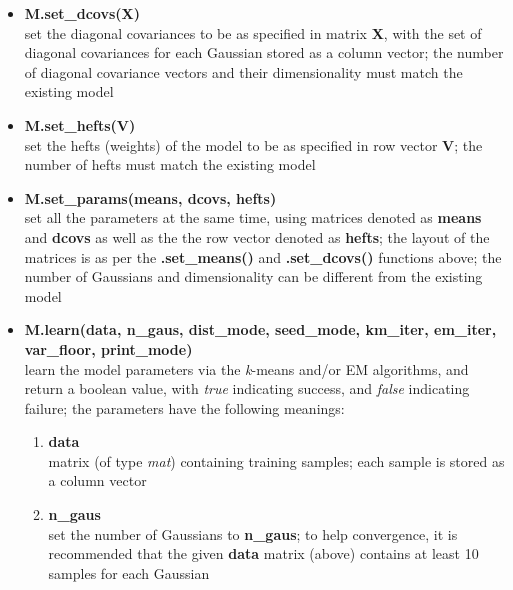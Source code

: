 \begin{itemize}
\item
{\bf M.set\_dcovs(X)}\\
set the diagonal covariances to be as specified in matrix {\bf X}, with the set of diagonal covariances for each Gaussian stored as a column vector;
the number of diagonal covariance vectors and their dimensionality must match the existing model

\item
{\bf M.set\_hefts(V)}\\
set the hefts (weights) of the model to be as specified in row vector {\bf V};
the number of hefts must match the existing model

\item
{\bf M.set\_params(means, dcovs, hefts)}\\
set all the parameters at the same time, using matrices denoted as {\bf means} and {\bf dcovs} as well as the the row vector denoted as {\bf hefts};
the layout of the matrices is as per the {\bf .set\_means()} and {\bf .set\_dcovs()} functions above;
the number of Gaussians and dimensionality can be different from the existing model

\item
{\bf M.learn(data, n\_gaus, dist\_mode, seed\_mode, km\_iter, em\_iter, var\_floor, print\_mode)}\\
learn the model parameters via the {\it k}-means and/or EM algorithms,
and return a boolean value, with {\it true} indicating success, and {\it false} indicating failure;
the parameters have the following meanings:

\begin{enumerate}[{$\cdot$}]
\item
{\bf data}\\
matrix (of type {\it mat}) containing training samples; each sample is stored as a column vector

\item
{\bf n\_gaus}\\
set the number of Gaussians to {\bf n\_gaus};
to help convergence, it is recommended that the given {\bf data} matrix (above)
contains at least 10 samples for each Gaussian


\end{enumerate}
\end{itemize}
